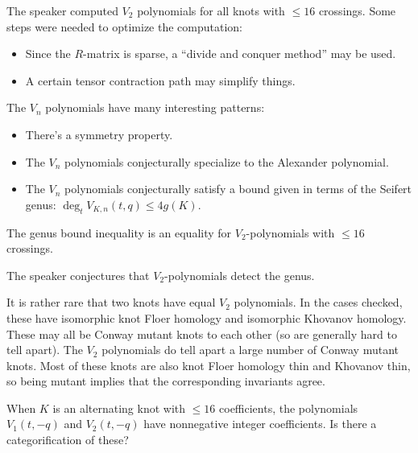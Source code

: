\documentclass{amsart}
\begin{document}
The speaker computed $V_2$ polynomials for all knots with $\leq 16$ crossings.
Some steps were needed to optimize the computation:
\begin{itemize}
  \item Since the $R$-matrix is sparse, a ``divide and conquer method'' may be used.
  \item A certain tensor contraction path may simplify things.
\end{itemize}

The $V_n$ polynomials have many interesting patterns: 
\begin{itemize}
  \item There's a symmetry property.
  \item The $V_n$ polynomials conjecturally specialize to the Alexander polynomial.
  \item The $V_n$ polynomials conjecturally satisfy a bound given in terms of the Seifert genus: $\deg_t V_{K,n}(t, q) \leq 4g(K)$.
\end{itemize}

\begin{thm}[Garoufalidis--L]
  The genus bound inequality is an equality for $V_2$-polynomials with $\leq 16$ crossings.
\end{thm}

The speaker conjectures that $V_2$-polynomials detect the genus.

It is rather rare that two knots have equal $V_2$ polynomials.
In the cases checked, these have isomorphic knot Floer homology and isomorphic Khovanov homology.
These may all be Conway mutant knots to each other (so are generally hard to tell apart).
The $V_2$ polynomials do tell apart a large number of Conway mutant knots.
Most of these knots are also knot Floer homology thin and Khovanov thin, so being mutant implies that the corresponding invariants agree.

When $K$ is an alternating knot with $\leq 16$ coefficients, the polynomials $V_1(t, -q)$ and $V_2(t, -q)$ have nonnegative integer coefficients.
Is there a categorification of these?
\end{document}
